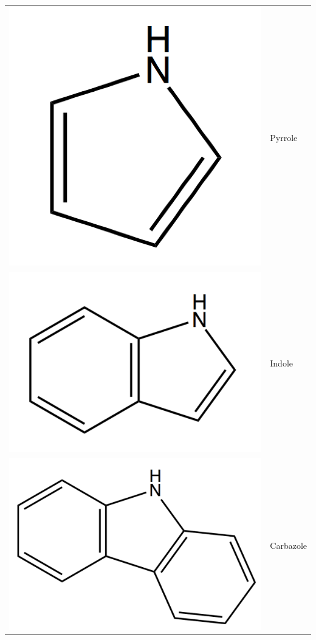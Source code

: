 \begin{table}[h!]
\begin{center}
\begin{tabular}{rl}
			\includegraphics[scale=0.08]{image/pyrrole} & Pyrrole \\
			\includegraphics[scale=0.08]{image/indole} & Indole \\
			\includegraphics[scale=0.08]{image/carbazole} & Carbazole \\

\end{tabular}
\end{center}
\end{table}
